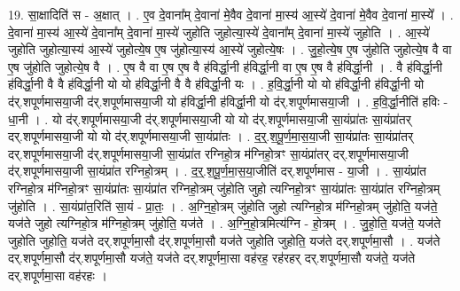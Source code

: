 \documentclass[17pt]{extarticle}
\begin{document}
19. सा॒क्षादिति॑ स - अ॒क्षात् । . ए॒व दे॒वाना᳚म् दे॒वाना॑ मे॒वैव दे॒वाना॑ मा॒स्य॑ आ॒स्ये॑ दे॒वाना॑ मे॒वैव दे॒वाना॑ मा॒स्ये᳚ । . दे॒वाना॑ मा॒स्य॑ आ॒स्ये॑ दे॒वाना᳚म् दे॒वाना॑ मा॒स्ये॑ जुहोति जुहोत्या॒स्ये॑ दे॒वाना᳚म् दे॒वाना॑ मा॒स्ये॑ जुहोति । . आ॒स्ये॑ जुहोति जुहोत्या॒स्य॑ आ॒स्ये॑ जुहोत्ये॒ष ए॒ष जु॑होत्या॒स्य॑ आ॒स्ये॑ जुहोत्ये॒षः । . जु॒हो॒त्ये॒ष ए॒ष जु॑होति जुहोत्ये॒ष वै वा ए॒ष जु॑होति जुहोत्ये॒ष वै । . ए॒ष वै वा ए॒ष ए॒ष वै ह॑विर्द्धा॒नी ह॑विर्द्धा॒नी वा ए॒ष ए॒ष वै ह॑विर्द्धा॒नी । . वै ह॑विर्द्धा॒नी ह॑विर्द्धा॒नी वै वै ह॑विर्द्धा॒नी यो यो ह॑विर्द्धा॒नी वै वै ह॑विर्द्धा॒नी यः । . ह॒वि॒र्द्धा॒नी यो यो ह॑विर्द्धा॒नी ह॑विर्द्धा॒नी यो द॑र्.शपूर्णमासया॒जी द॑र्.शपूर्णमासया॒जी यो ह॑विर्द्धा॒नी ह॑विर्द्धा॒नी यो द॑र्.शपूर्णमासया॒जी । . ह॒वि॒र्द्धा॒नीति॑ हविः - धा॒नी । . यो द॑र्.शपूर्णमासया॒जी द॑र्.शपूर्णमासया॒जी यो यो द॑र्.शपूर्णमासया॒जी सा॒यंप्रा॑तः सा॒यंप्रा॑तर् दर्.शपूर्णमासया॒जी यो यो द॑र्.शपूर्णमासया॒जी सा॒यंप्रा॑तः । . द॒र्॒.श॒पू॒र्ण॒मा॒स॒या॒जी सा॒यंप्रा॑तः सा॒यंप्रा॑तर् दर्.शपूर्णमासया॒जी द॑र्.शपूर्णमासया॒जी सा॒यंप्रा॑त रग्निहो॒त्र म॑ग्निहो॒त्रꣳ सा॒यंप्रा॑तर् दर्.शपूर्णमासया॒जी द॑र्.शपूर्णमासया॒जी सा॒यंप्रा॑त रग्निहो॒त्रम् । . द॒र्॒.श॒पू॒र्ण॒मा॒स॒या॒जीति॑ दर्.शपूर्णमास - या॒जी । . सा॒यंप्रा॑त रग्निहो॒त्र म॑ग्निहो॒त्रꣳ सा॒यंप्रा॑तः सा॒यंप्रा॑त रग्निहो॒त्रम् जु॑होति जुहो त्यग्निहो॒त्रꣳ सा॒यंप्रा॑तः सा॒यंप्रा॑त रग्निहो॒त्रम् जु॑होति । . सा॒यंप्रा॑त॒रिति॑ सा॒यं - प्रा॒तः॒ । . अ॒ग्नि॒हो॒त्रम् जु॑होति जुहो त्यग्निहो॒त्र म॑ग्निहो॒त्रम् जु॑होति॒ यज॑ते॒ यज॑ते जुहो त्यग्निहो॒त्र म॑ग्निहो॒त्रम् जु॑होति॒ यज॑ते । . अ॒ग्नि॒हो॒त्रमित्य॑ग्नि - हो॒त्रम् । . जु॒हो॒ति॒ यज॑ते॒ यज॑ते जुहोति जुहोति॒ यज॑ते दर्.शपूर्णमा॒सौ द॑र्.शपूर्णमा॒सौ यज॑ते जुहोति जुहोति॒ यज॑ते दर्.शपूर्णमा॒सौ । . यज॑ते दर्.शपूर्णमा॒सौ द॑र्.शपूर्णमा॒सौ यज॑ते॒ यज॑ते दर्.शपूर्णमा॒सा वह॑रह॒ रह॑रहर् दर्.शपूर्णमा॒सौ यज॑ते॒ यज॑ते दर्.शपूर्णमा॒सा वह॑रहः । \newline
\end{document}
